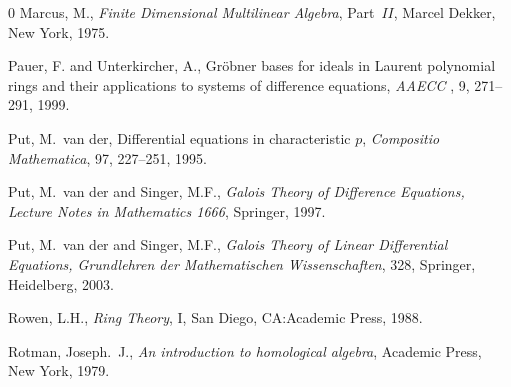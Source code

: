 \begin{thebibliography}{0}
 Marcus, M.,
{\em Finite Dimensional Multilinear Algebra}, Part~$II$, Marcel
Dekker, New York, 1975.









 Pauer, F. and Unterkircher, A., {G}r{\"o}bner bases for ideals in {L}aurent
 polynomial rings and their applications to systems
            of difference equations, {\em AAECC },  9, 271--291,
            1999.




Put, {M.~van der}, Differential equations in characteristic $p$,
{\em Compositio Mathematica}, 97, 227--251, 1995.





Put, M.~van der and Singer, M.F.,
 {\em Galois Theory of Difference Equations,  Lecture Notes in Mathematics 1666},
 Springer, 1997.


 Put, M.~van der and Singer, M.F.,
{\em Galois Theory of Linear Differential Equations,
               Grundlehren der Mathematischen Wissenschaften}, 328,
Springer, Heidelberg, 2003.


Rowen, L.H., {\em Ring Theory}, I, San Diego, CA:Academic Press,
1988.




Rotman, Joseph.~J., {\em An introduction to homological algebra},
Academic Press, New York, 1979.



\end{thebibliography}
